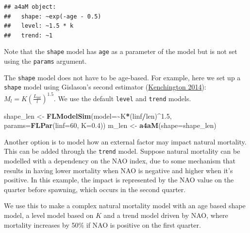 \documentclass[
]{book}
\newenvironment{Shaded}{\begin{snugshade}}{\end{snugshade}}
\newcommand{\AttributeTok}[1]{\textcolor[rgb]{0.13,0.29,0.53}{#1}}
\newcommand{\DecValTok}[1]{\textcolor[rgb]{0.00,0.00,0.81}{#1}}
\newcommand{\FloatTok}[1]{\textcolor[rgb]{0.00,0.00,0.81}{#1}}
\newcommand{\FunctionTok}[1]{\textcolor[rgb]{0.13,0.29,0.53}{\textbf{#1}}}
\newcommand{\NormalTok}[1]{#1}
\newcommand{\OtherTok}[1]{\textcolor[rgb]{0.56,0.35,0.01}{#1}}
\newcommand{\SpecialCharTok}[1]{\textcolor[rgb]{0.81,0.36,0.00}{\textbf{#1}}}
\begin{document}
\begin{verbatim}
## a4aM object:
##   shape: ~exp(-age - 0.5)
##   level: ~1.5 * k
##   trend: ~1
\end{verbatim}

Note that the \texttt{shape} model has \texttt{age} as a parameter of the model but is not set using the \texttt{params} argument.

The \texttt{shape} model does not have to be age-based. For example, here we set up a \texttt{shape} model using Gislason's second estimator (\protect\hyperlink{ref-Kenchington2014}{Kenchington 2014}): \(M_l=K(\frac{L_{\inf}}{l})^{1.5}\). We use the default \texttt{level} and \texttt{trend} models.

\begin{Shaded}
\begin{Highlighting}[]
\NormalTok{shape\_len }\OtherTok{\textless{}{-}} \FunctionTok{FLModelSim}\NormalTok{(}\AttributeTok{model=}\SpecialCharTok{\textasciitilde{}}\NormalTok{K}\SpecialCharTok{*}\NormalTok{(linf}\SpecialCharTok{/}\NormalTok{len)}\SpecialCharTok{\^{}}\FloatTok{1.5}\NormalTok{, }\AttributeTok{params=}\FunctionTok{FLPar}\NormalTok{(}\AttributeTok{linf=}\DecValTok{60}\NormalTok{, }\AttributeTok{K=}\FloatTok{0.4}\NormalTok{))}
\NormalTok{m\_len }\OtherTok{\textless{}{-}} \FunctionTok{a4aM}\NormalTok{(}\AttributeTok{shape=}\NormalTok{shape\_len)}
\end{Highlighting}
\end{Shaded}

Another option is to model how an external factor may impact natural mortality. This can be added through the \texttt{trend} model. Suppose natural mortality can be modelled with a dependency on the NAO index, due to some mechanism that results in having lower mortality when NAO is negative and higher when it's positive. In this example, the impact is represented by the NAO value on the quarter before spawning, which occurs in the second quarter.

We use this to make a complex natural mortality model with an age based shape model, a level model based on \(K\) and a trend model driven by NAO, where mortality increases by 50\% if NAO is positive on the first quarter.
\end{document}
